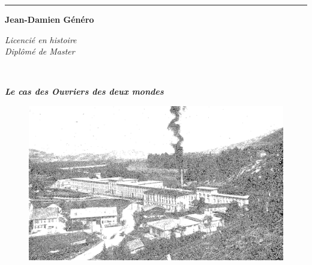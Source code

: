 \begin{titlepage}
\begin{center}

\bigskip

\begin{large}
\end{large}
\begin{center}\rule{2cm}{0.02cm}\end{center}

\bigskip
\bigskip
\bigskip
\begin{Large}
\textbf{Jean-Damien Généro}\\
\end{Large}
\begin{normalsize} \textit{Licencié en histoire}\\
\textit{Diplômé de Master}\\
\end{normalsize}

\bigskip
\bigskip

\begin{Huge}
\textbf{}\\
\end{Huge}
\bigskip
\bigskip
\begin{LARGE}
\textbf{\emph{Le cas des Ouvriers des deux mondes} }\\
\end{LARGE}

\bigskip

\bigskip

\begin{figure}[h]
    \centering
    \includegraphics[width=12cm]{img/couv.png}
    \label{fig:ill_couv}
\end{figure}


\end{center}
\end{titlepage}
